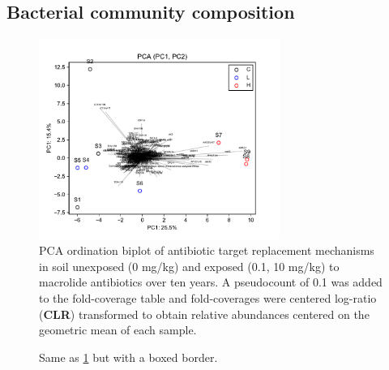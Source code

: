 \subsection{Bacterial community composition}

\Blindtext[10]

\begin{figure}[H]
	\centering
		\includegraphics[width=0.7\textwidth]{figures/PCA-1-2_biplot_ARG-antibiotic-target-replacement.pdf}
	\caption{PCA ordination biplot of antibiotic target replacement mechanisms in soil unexposed (0 mg/kg) and exposed (0.1, 10 mg/kg) to macrolide antibiotics over ten years. A pseudocount of 0.1 was added to the fold-coverage table and fold-coverages were centered log-ratio (\textbf{CLR}) transformed to obtain relative abundances centered on the geometric mean of each sample.}
	\label{fig:PCA-1-2_biplot_ARG-antibiotic-target-replacement}
\end{figure}

\begin{figure}[H]
	\centering
	\caption{Same as \ref{fig:PCA-1-2_biplot_ARG-antibiotic-target-replacement} but with a boxed border.}
	\label{fig:PCA-1-2_biplot_ARG-antibiotic-target-replacement_boxed}
\end{figure}
